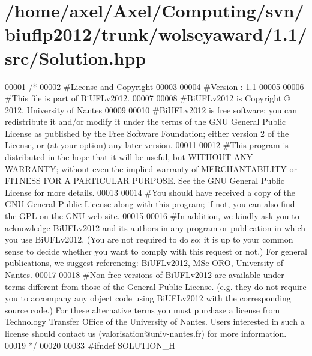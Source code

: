 \hypertarget{Solution_8hpp_source}{\section{/home/axel/\-Axel/\-Computing/svn/biuflp2012/trunk/wolseyaward/1.1/src/\-Solution.hpp}
}

\begin{DoxyCode}
00001 \textcolor{comment}{/*}
00002 \textcolor{comment}{ #License and Copyright}
00003 \textcolor{comment}{ }
00004 \textcolor{comment}{ #Version : 1.1}
00005 \textcolor{comment}{ }
00006 \textcolor{comment}{ #This file is part of BiUFLv2012.}
00007 \textcolor{comment}{ }
00008 \textcolor{comment}{ #BiUFLv2012 is Copyright © 2012, University of Nantes}
00009 \textcolor{comment}{ }
00010 \textcolor{comment}{ #BiUFLv2012 is free software; you can redistribute it and/or modify it under
       the terms of the GNU General Public License as published by the Free Software
       Foundation; either version 2 of the License, or (at your option) any later version.}
00011 \textcolor{comment}{ }
00012 \textcolor{comment}{ #This program is distributed in the hope that it will be useful, but WITHOUT
       ANY WARRANTY; without even the implied warranty of MERCHANTABILITY or FITNESS FOR
       A PARTICULAR PURPOSE. See the GNU General Public License for more details.}
00013 \textcolor{comment}{ }
00014 \textcolor{comment}{ #You should have received a copy of the GNU General Public License along with
       this program; if not, you can also find the GPL on the GNU web site.}
00015 \textcolor{comment}{ }
00016 \textcolor{comment}{ #In addition, we kindly ask you to acknowledge BiUFLv2012 and its authors in
       any program or publication in which you use BiUFLv2012. (You are not required to
       do so; it is up to your common sense to decide whether you want to comply with
       this request or not.) For general publications, we suggest referencing: 
       BiUFLv2012, MSc ORO, University of Nantes.}
00017 \textcolor{comment}{ }
00018 \textcolor{comment}{ #Non-free versions of BiUFLv2012 are available under terms different from
       those of the General Public License. (e.g. they do not require you to accompany any
       object code using BiUFLv2012 with the corresponding source code.) For these
       alternative terms you must purchase a license from Technology Transfer Office of the
       University of Nantes. Users interested in such a license should contact us
       (valorisation@univ-nantes.fr) for more information.}
00019 \textcolor{comment}{ */}
00020 
00033 \textcolor{preprocessor}{#ifndef SOLUTION\_H}

\end{DoxyCode}
